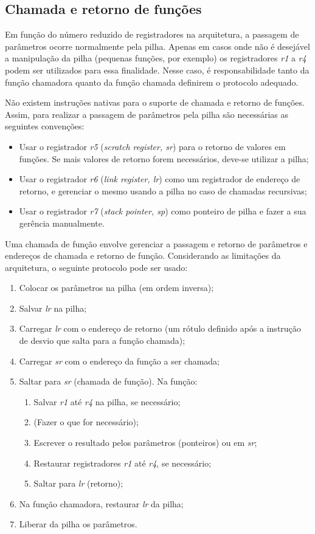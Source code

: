 \documentclass{extreport}
\begin{document}
\subsection{Chamada e retorno de funções}
\label{ref:fcalls}
Em função do número reduzido de registradores na arquitetura, a passagem de parâmetros ocorre normalmente pela pilha. Apenas em casos onde não é desejável a manipulação da pilha (pequenas funções, por exemplo) os registradores \textit{r1} a \textit{r4} podem ser utilizados para essa finalidade. Nesse caso, é responsabilidade tanto da função chamadora quanto da função chamada definirem o protocolo adequado.

Não existem instruções nativas para o suporte de chamada e retorno de funções. Assim, para realizar a passagem de parâmetros pela pilha são necessárias as seguintes convenções:

\begin{itemize}
\item Usar o registrador \textit{r5} (\textit{scratch register, sr}) para o retorno de valores em funções. Se mais valores de retorno forem necessários, deve-se utilizar a pilha;
\item Usar o registrador \textit{r6} (\textit{link register, lr}) como um registrador de endereço de retorno, e gerenciar o mesmo usando a pilha no caso de chamadas recursivas;
\item Usar o registrador \textit{r7} (\textit{stack pointer, sp}) como ponteiro de pilha e fazer a sua gerência manualmente.
\end{itemize}

Uma chamada de função envolve gerenciar a passagem e retorno de parâmetros e endereços de chamada e retorno de função. Considerando as limitações da arquitetura, o seguinte protocolo pode ser usado:

\begin{enumerate}
\item Colocar os parâmetros na pilha (em ordem inversa);
\item Salvar \textit{lr} na pilha;
\item Carregar \textit{lr} com o endereço de retorno (um rótulo definido após a instrução de desvio que salta para a função chamada);
\item Carregar \textit{sr} com o endereço da função a ser chamada;
\item Saltar para \textit{sr} (chamada de função). Na função:
	\begin{enumerate}
	\item Salvar \textit{r1} até \textit{r4} na pilha, se necessário;
	\item (Fazer o que for necessário);
	\item Escrever o resultado pelos parâmetros (ponteiros) ou em \textit{sr};
	\item Restaurar registradores \textit{r1} até \textit{r4}, se necessário;
	\item Saltar para \textit{lr} (retorno);
	\end{enumerate}
\item Na função chamadora, restaurar \textit{lr} da pilha;
\item Liberar da pilha os parâmetros.
\end{enumerate}
\end{document}
